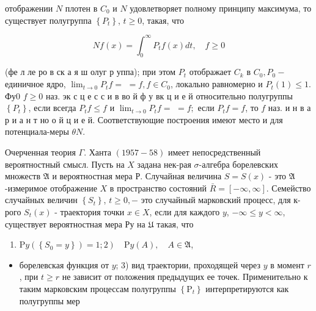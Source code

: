 \documentclass[10pt]{article}
\begin{document}
отображении $N$ плотен в $C_{0}$ и $N$ удовлетворяет полному принципу максимума, то существует полугруппа $\left\{P_{t}\right\}$, $t \geqslant 0$, такая, что



\[

N f(x)=\int_{0}^{\infty} P_{t} f(x) d t, \quad f \geqslant 0

\]



(фе л ле ро в ск а я ш олуг р уппа); при этом $P_{t}$ отображает $C_{k}$ в $C_{0}, P_{0}-$ единичное ядро, $\lim _{t \rightarrow 0} P_{t} f=$ $=f, f \in C_{0}$, локально равномерно и $P_{t}(1) \leqslant 1$. Фу0 $f \geqslant 0$ наз. эк с ц е с с и в во й ф у вк ц и е й относительно полугруппы $\left\{P_{t}\right\}$, если всегда $P_{t} f \leqslant f$ и $\lim _{t \rightarrow 0} P_{t} f=$ $=f ;$ если $P_{t} f=f$, то $f$ наз. и н в а р и а н т но о й ц и е й. Соответствующие построения имеют место и для потенциала-меры $\theta N$.



Очерченная теория $\Gamma$. Ханта $(1957-58)$ имеет непосредственный вероятностный смысл. Пусть на $X$ задана нек-рая $\sigma$-алгебра борелевских множеств $\mathfrak{A}$ и вероятностная мера Р. Случайная величина $S=S(x)$ - это $\mathfrak{A}$-измеримое отображение $X$ в пространство состояний $\bar{R}=[-\infty, \infty]$. Семейство случайных величин $\left\{S_{t}\right\}$, $t \geqslant 0,-$ это случайный марковский процесс, для к-рого $S_{t}(x)$ - траектория точки $x \in X$, если для каждого $y$, $-\infty \leqslant y<\infty$, существует вероятностная мера Ру на $\mathfrak{U}$ такая, что



\begin{enumerate}

  \item $\left.\mathrm{P} y\left(\left\{S_{0}=y\right\}\right)=1 ; 2\right) \quad \mathrm{P} y(A), \quad A \in \mathfrak{A}$,

\end{enumerate}



\begin{itemize}

  \item борелевская функция от $y$; 3) вид траектории, проходящей через $y$ в момент $r$, при $t \geqslant r$ не зависит от положения предыдущих ее точек. Применительно к таким марковским процессам полугруппы $\left\{\mathrm{P}_{t}\right\}$ интерпретируются как полугруппы мер

\end{itemize}
\end{document}
